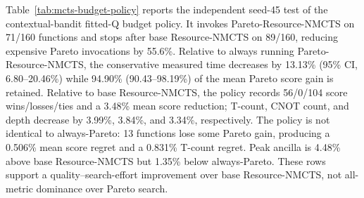 \documentclass[11pt]{article}
\newcommand{\method}{Resource-NMCTS}
\begin{document}
\begin{table}[H]
\centering
\scriptsize
\setlength{\tabcolsep}{3pt}
\renewcommand{\arraystretch}{1.08}
\caption{Search-control baseline audit.  Rows state which search/control
baseline is being tested and which stronger claim remains outside the evidence
for that comparison.}
\label{tab:search-control-baseline-audit}

\end{table}

\begin{table}[H]
\centering
\scriptsize
\setlength{\tabcolsep}{3pt}
\renewcommand{\arraystretch}{1.08}
\caption{Same-budget bit-flip random-prior control.  W/L/T compares the learned
prior with the per-function mean over eight deterministic random-prior repeats;
negative score changes favor the learned prior.}
\label{tab:bitflip-random-prior}

\end{table}

\begin{table}[H]
\centering
\scriptsize
\setlength{\tabcolsep}{2pt}
\renewcommand{\arraystretch}{1.06}
\caption{Low-budget learned-prior sweep for the bit-flip branch.  Learned and
no-prior rows use the same functions, methods, candidate legality checks, and
verification route; only the action-prior scorer and search budget differ.}
\label{tab:bitflip-budget-sweep}

\end{table}

Table~\ref{tab:mcts-budget-policy} reports the independent seed-45 test of the
contextual-bandit fitted-Q budget policy.  It invokes Pareto-\method{} on
71/160 functions and stops after base \method{} on 89/160, reducing expensive
Pareto invocations by 55.6\%.  Relative to always running Pareto-\method{}, the
conservative measured time decreases by 13.13\% (95\% CI, 6.80--20.46\%) while
94.90\% (90.43--98.19\%) of the mean Pareto score gain is retained.  Relative
to base \method{}, the policy records 56/0/104 score wins/losses/ties and a
3.48\% mean score reduction; T-count, CNOT count, and depth decrease by 3.99\%,
3.84\%, and 3.34\%, respectively.  The policy is not identical to always-Pareto:
13 functions lose some Pareto gain, producing a 0.506\% mean score regret and
a 0.831\% T-count regret.  Peak ancilla is 4.48\% above base \method{} but
1.35\% below always-Pareto.  These rows support a quality--search-effort
improvement over base \method{}, not all-metric dominance over Pareto search.
\end{document}
